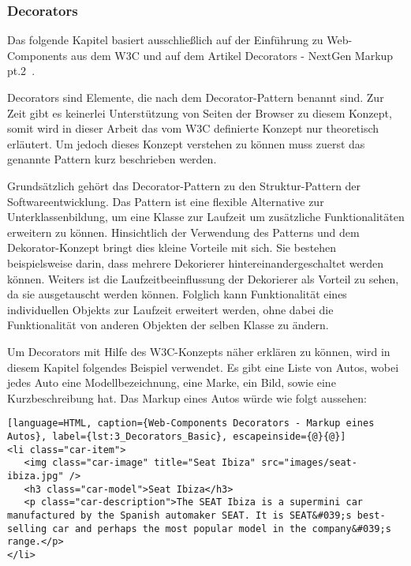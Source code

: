 \subsubsection{Decorators}
\label{sec:3_WC_Decorators}

Das folgende Kapitel basiert ausschließlich auf der Einführung zu Web-Components aus dem W3C \citereset \autocite{CooneyGlazkov.2013} und auf dem Artikel \glqq Decorators - NextGen Markup pt.2\grqq\ \citereset \autocite{PreventDefault.2013}.

Decorators sind Elemente, die nach dem Decorator-Pattern benannt sind. Zur Zeit gibt es keinerlei Unterstützung von Seiten der Browser zu diesem Konzept, somit wird in dieser Arbeit das vom W3C definierte Konzept nur theoretisch erläutert. Um jedoch dieses Konzept verstehen zu können muss zuerst das genannte Pattern kurz beschrieben werden.

Grundsätzlich gehört das Decorator-Pattern zu den Struktur-Pattern der Softwareentwicklung. Das Pattern ist eine flexible Alternative zur Unterklassenbildung, um eine Klasse zur Laufzeit um zusätzliche Funktionalitäten erweitern zu können. Hinsichtlich der Verwendung des Patterns und dem Dekorator-Konzept bringt dies kleine Vorteile mit sich. Sie bestehen beispielsweise darin, dass mehrere Dekorierer hintereinandergeschaltet werden können. Weiters ist die Laufzeitbeeinflussung der Dekorierer als Vorteil zu sehen, da sie ausgetauscht werden können. Folglich kann Funktionalität eines individuellen Objekts zur Laufzeit erweitert werden, ohne dabei die Funktionalität von anderen Objekten der selben Klasse zu ändern.

Um Decorators mit Hilfe des W3C-Konzepts näher erklären zu können, wird in diesem Kapitel folgendes Beispiel verwendet. Es gibt eine Liste von Autos, wobei jedes Auto
eine Modellbezeichnung, eine Marke, ein Bild, sowie eine Kurzbeschreibung hat. Das Markup eines Autos würde wie folgt aussehen:

\begin{lstlisting}[language=HTML, caption={Web-Components Decorators - Markup eines Autos}, label={lst:3_Decorators_Basic}, escapeinside={@}{@}]
<li class="car-item">
   <img class="car-image" title="Seat Ibiza" src="images/seat-ibiza.jpg" />
   <h3 class="car-model">Seat Ibiza</h3>
   <p class="car-description">The SEAT Ibiza is a supermini car manufactured by the Spanish automaker SEAT. It is SEAT&#039;s best-selling car and perhaps the most popular model in the company&#039;s range.</p>
</li>
\end{lstlisting}

